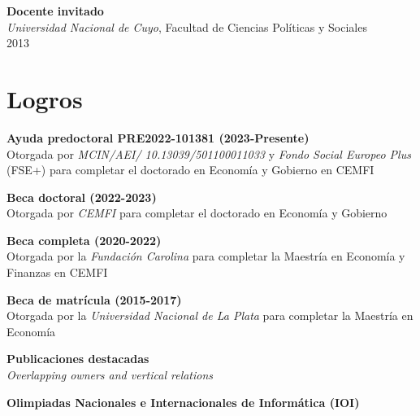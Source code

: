 \documentclass[margin,center,a4paper]{res}
\begin{document}
\begin{resume}
		\textbf{Docente invitado} \\
		{\sl Universidad Nacional de Cuyo}, Facultad de Ciencias Políticas y Sociales \\
		\hspace*{0.3in}   \hfill 2013
		
		
		\clearpage

		\section{Logros}
		
		\textbf{Ayuda predoctoral PRE2022-101381 (2023-Presente)} \\
		Otorgada por {\sl MCIN/AEI/ 10.13039/501100011033} y {\sl Fondo Social Europeo Plus} (FSE+) para completar el doctorado en Economía y Gobierno en CEMFI
		
		\textbf{Beca doctoral (2022-2023)} \\
		Otorgada por {\sl CEMFI} para completar el doctorado en Economía y Gobierno
		
		\textbf{Beca completa (2020-2022)} \\
		Otorgada por la {\sl Fundación Carolina} para completar la Maestría en Economía y Finanzas en CEMFI
		
		\textbf{Beca de matrícula (2015-2017)} \\
		Otorgada por la {\sl Universidad Nacional de La Plata} para completar la Maestría en Economía
		
		\textbf{Publicaciones destacadas} \\
		\textit{Overlapping owners and vertical relations} \\
		
		\textbf{Olimpiadas Nacionales e Internacionales de Informática (IOI)} \\
		

\end{resume}
\end{document}
